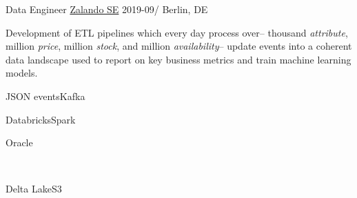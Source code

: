 \documentclass[%
version=last,%
fontsize=11pt,%
paper=A4,%
areasetadvanced,%
headinclude=false,%
footinclude=false,%
headlines=0,%
footlines=0,%
toc=bibnumbered,%
]{scrartcl}
\begin{document}
\begin{minipage}[t]{0.575\textwidth}
  \vspace*{0cm}%
  \WorkEntry%
  {Data Engineer}%
  {\href{https://corporate.zalando.com/en}{Zalando SE}}%
  {2019-09/}%
  {Berlin, DE}%
  {%
    Development of ETL pipelines which every day process %
    over\---  thousand \emph{attribute}, 
    million \emph{price},  million \emph{stock}, and
     million \emph{availability}\--- update events into a
    coherent data landscape used to report on key business metrics and train
    machine learning models.%
    \leavevmode\vspace*{20pt}\newline\begingroup%
    \begin{minipage}{.2\linewidth}
      \begin{tcolorbox}[title=Nakadi,remember as=Kafka]
        JSON events\tcblower{}Kafka
      \end{tcolorbox}
    \end{minipage}%
    \hfill%
    \begin{minipage}{.2\linewidth}
      \begin{tcolorbox}[title=AWS,remember as=Spark]
        Databricks\tcblower{}Spark
      \end{tcolorbox}%
    \end{minipage}%
    \hfill%
    \begin{minipage}{.2\linewidth}
      \begin{tcolorbox}[remember as=Oracle,colframe=framered,colback=backred]
        Oracle
      \end{tcolorbox}%
      \\%
      \begin{tcolorbox}[remember as=S3]
        Delta Lake\tcblower{}S3
      \end{tcolorbox}
    \end{minipage}%
    \hfill%
    \begin{minipage}{.15\linewidth}
      \begin{tcolorbox}[remember as=Exasol]

\end{tcolorbox}
\end{minipage}}
\end{minipage}
\end{document}
